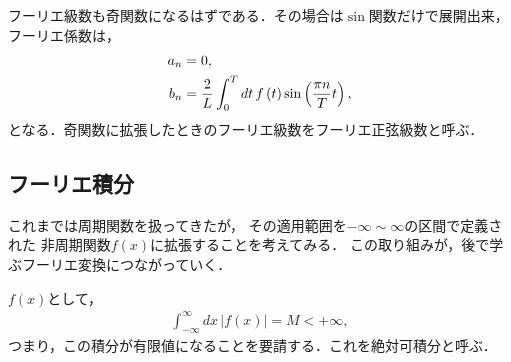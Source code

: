 フーリエ級数も奇関数になるはずである．その場合は$\sin$関数だけで展開出来，
フーリエ係数は，
\begin{align}
  a_n & = 0, \notag \\
  b_n & = \dfrac{2}{L}\int_{0}^{T}dt\,f\left(t\right) \sin\left(\dfrac{\pi n}{T}t\right),
\end{align}
となる．奇関数に拡張したときのフーリエ級数をフーリエ正弦級数と呼ぶ．
%
%
%

\subsection{フーリエ積分}
%
これまでは周期関数を扱ってきたが，
その適用範囲を$-\infty\sim \infty$の区間で定義された
非周期関数$f(x)$に拡張することを考えてみる．
この取り組みが，後で学ぶフーリエ変換につながっていく．

$f(x)$として，
\begin{align}
 \int_{-\infty}^{\infty}dx\,\left|f\left(x\right)\right| = M < + \infty, 
\end{align}
つまり，この積分が有限値になることを要請する．これを絶対可積分と呼ぶ．

